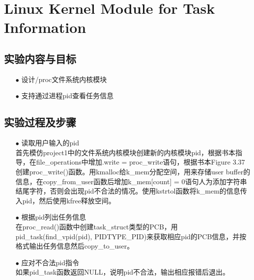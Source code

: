 \documentclass{article}
\begin{document}
\section{Linux Kernel Module for Task Information}
\subsection{实验内容与目标}
\begin{itemize}
\item[$\bullet$]设计/proc文件系统内核模块
\item[$\bullet$]支持通过进程pid查看任务信息
\end{itemize}
\subsection{实验过程及步骤}
\begin{itemize}
\item[$\bullet$]读取用户输入的pid\\
首先模仿project1中的文件系统内核模块创建新的内核模块pid，根据书本指导，在file\_operations中增加.write = proc\_write语句，根据书本Figure 3.37创建proc\_write()函数。用kmalloc给k\_mem分配空间，用来存储user buffer的信息，在copy\_from\_user函数后增加k\_mem[count] = 0语句人为添加字符串结尾字符，否则会出现pid不合法的情况。使用kstrtol函数将k\_mem的信息传入pid，然后使用kfree释放空间。
\item[$\bullet$]根据pid列出任务信息\\
在proc\_read()函数中创建task\_struct类型的PCB，用pid\_task(find\_vpid(pid), PIDTYPE\_PID)来获取相应pid的PCB信息，并按格式输出任务信息然后copy\_to\_user。
\item[$\bullet$]应对不合法pid指令\\
如果pid\_task函数返回NULL，说明pid不合法，输出相应报错后退出。
\end{itemize}
\end{document}
